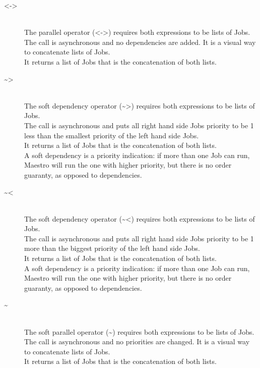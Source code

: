 \begin{description}
\item[<->] \hfil \\
The parallel operator (<->) requires both expressions to be lists of Jobs.\\
The call is asynchronous and no dependencies are added. It is a visual way to
concatenate lists of Jobs.\\
It returns a list of Jobs that is the concatenation of both lists.

\item[\textasciitilde>] \hfil \\
The soft dependency operator (\textasciitilde>) requires both expressions to be lists of Jobs.\\
The call is asynchronous and puts all right hand side Jobs priority to be 1 less than the smallest
priority of the left hand side Jobs.\\
It returns a list of Jobs that is the concatenation of both lists.\\
A soft dependency is a priority indication: if more than one Job can run, Maestro will run the
one with higher priority, but there is no order guaranty, as opposed to dependencies.

\item[\textasciitilde<] \hfil \\
The soft dependency operator (\textasciitilde<) requires both expressions to be lists of Jobs.\\
The call is asynchronous and puts all right hand side Jobs priority to be 1 more than the biggest
priority of the left hand side Jobs.\\
It returns a list of Jobs that is the concatenation of both lists.\\
A soft dependency is a priority indication: if more than one Job can run, Maestro will run the
one with higher priority, but there is no order guaranty, as opposed to dependencies.

\item[\textasciitilde] \hfil \\
The soft parallel operator (\textasciitilde) requires both expressions to be lists of Jobs.\\
The call is asynchronous and no priorities are changed. It is a visual way to
concatenate lists of Jobs.\\
It returns a list of Jobs that is the concatenation of both lists.
\end{description}

